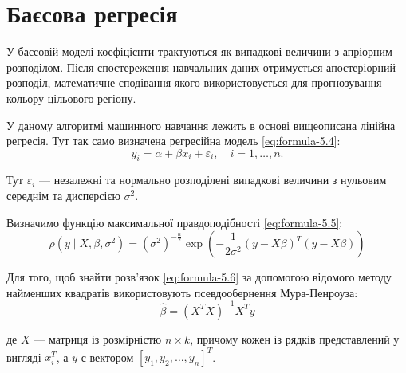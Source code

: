\section{Баєсова регресія}

У баєсовій моделі коефіцієнти трактуються як %
випадкові величини з апріорним розподілом. Після спостереження навчальних даних %
отримується апостеріорний розподіл, %
математичне сподівання якого використовується для %
прогнозування кольору цільового регіону.

У даному алгоритмі машинного навчання лежить в основі вищеописана лінійна регресія.
Тут так само визначена регресійна модель \eqref{eq:formula-5.4}:
\begin{equation}
	y_{i} = \alpha + \beta x_{i} + \varepsilon_{i}, \quad i = 1, \dots, n. \label{eq:formula-5.4}
\end{equation}

Тут $\varepsilon_{i}$ --- незалежні та нормально розподілені випадкові величини з
нульовим середнім та дисперсією $\sigma^{2}$.

Визначимо функцію максимальної правдоподібності \eqref{eq:formula-5.5}:
\begin{equation}
	\rho(y \mid X, \beta, \sigma^{2}) = (\sigma^{2})^{-\frac{n}{2}}\exp\left(-\frac{1}{2\sigma^{2}}
	(y - X\beta)^{T}(y - X\beta)\right) \label{eq:formula-5.5}
\end{equation}

Для того, щоб знайти розв'язок \eqref{eq:formula-5.6} за допомогою відомого
методу найменших квадратів використовують псевдообернення Мура-Пенроуза:
\begin{equation}
	\hat{\beta}= (X^{T} X)^{-1}X^{T} y \label{eq:formula-5.6}
\end{equation}

де $X$ --- матриця із розмірністю $n \times k$, причому кожен із рядків представлений
у вигляді $x_{i}^{T}$, а $y$ є вектором $[y_{1}, y_{2}, \dots, y_{n}]^{T}$.